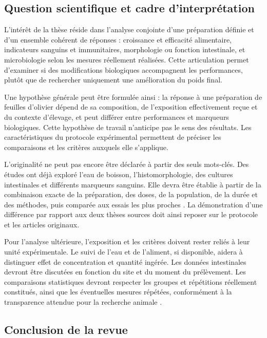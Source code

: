 \subsection{Question scientifique et cadre d'interprétation}

L'intérêt de la thèse réside dans l'analyse conjointe d'une préparation définie et d'un ensemble cohérent de réponses : croissance et efficacité alimentaire, indicateurs sanguins et immunitaires, morphologie ou fonction intestinale, et microbiologie selon les mesures réellement réalisées. Cette articulation permet d'examiner si des modifications biologiques accompagnent les performances, plutôt que de rechercher uniquement une amélioration du poids final.

Une hypothèse générale peut être formulée ainsi : la réponse à une préparation de feuilles d'olivier dépend de sa composition, de l'exposition effectivement reçue et du contexte d'élevage, et peut différer entre performances et marqueurs biologiques. Cette hypothèse de travail n'anticipe pas le sens des résultats. Les caractéristiques du protocole expérimental permettent de préciser les comparaisons et les critères auxquels elle s'applique.

L'originalité ne peut pas encore être déclarée à partir des seuls mots-clés. Des études ont déjà exploré l'eau de boisson, l'histomorphologie, des cultures intestinales et différents marqueurs sanguins. Elle devra être établie à partir de la combinaison exacte de la préparation, des doses, de la population, de la durée et des méthodes, puis comparée aux essais les plus proches \citep{Jabri2017,Oke2017,Erener2023}. La démonstration d'une différence par rapport aux deux thèses sources doit ainsi reposer sur le protocole et les articles originaux.

Pour l'analyse ultérieure, l'exposition et les critères doivent rester reliés à leur unité expérimentale. Le suivi de l'eau et de l'aliment, si disponible, aidera à distinguer effet de concentration et quantité ingérée. Les données intestinales devront être discutées en fonction du site et du moment du prélèvement. Les comparaisons statistiques devront respecter les groupes et répétitions réellement constitués, ainsi que les éventuelles mesures répétées, conformément à la transparence attendue pour la recherche animale \citep{PercieduSert2020}.

\subsection{Conclusion de la revue}

